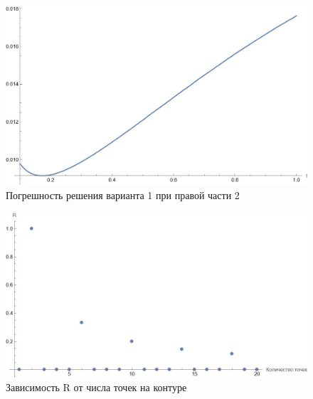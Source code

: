 \documentclass{article}
\begin{document}
		\begin{figure}[H]
        \centering
        \includegraphics[width=\textwidth]{diff_var_2.jpg}
        \caption{Погрешность решения варианта 1 при правой части 2}
    \end{figure}
			\begin{figure}[H]
        \centering
        \includegraphics[width=\textwidth]{R.jpg}
        \caption{Зависимость R от числа точек на контуре }
    \end{figure}
\end{document}
